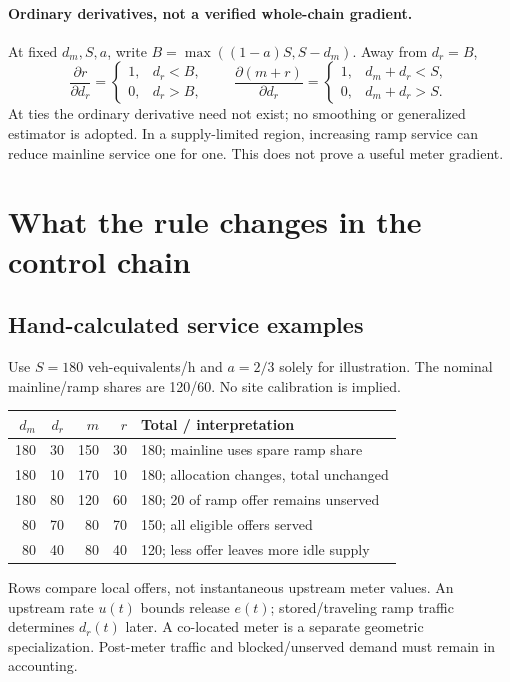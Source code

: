 \documentclass[10pt,a4paper]{article}
\begin{document}
\paragraph{Ordinary derivatives, not a verified whole-chain gradient.}
At fixed $d_m,S,a$, write $B=\max((1-a)S,S-d_m)$.
Away from $d_r=B$,
\begin{equation}
 \frac{\partial r}{\partial d_r}=\begin{cases}1,&d_r<B,\\0,&d_r>B,\end{cases}
 \qquad
 \frac{\partial(m+r)}{\partial d_r}
 =\begin{cases}1,&d_m+d_r<S,\\0,&d_m+d_r>S.\end{cases}
\end{equation}
At ties the ordinary derivative need not exist; no smoothing or generalized
estimator is adopted. In a supply-limited region, increasing ramp service can
reduce mainline service one for one. This does not prove a useful meter gradient.
\newpage

\section{What the rule changes in the control chain}
\subsection*{Hand-calculated service examples}
Use $S=180$ veh-equivalents/h and $a=2/3$ solely for illustration.
The nominal mainline/ramp shares are 120/60. No site calibration is implied.
\begin{center}
\begin{tabular}{rrrrl}
\toprule
$d_m$ & $d_r$ & $m$ & $r$ & Total / interpretation\\
\midrule
180&30&150&30&180; mainline uses spare ramp share\\
180&10&170&10&180; allocation changes, total unchanged\\
180&80&120&60&180; 20 of ramp offer remains unserved\\
80&70&80&70&150; all eligible offers served\\
80&40&80&40&120; less offer leaves more idle supply\\
\bottomrule
\end{tabular}
\end{center}
Rows compare local offers, not instantaneous upstream meter values. An upstream
rate $u(t)$ bounds release $e(t)$; stored/traveling ramp traffic determines
$d_r(t)$ later. A co-located meter is a separate geometric specialization.
Post-meter traffic and blocked/unserved demand must remain in accounting.
\end{document}
